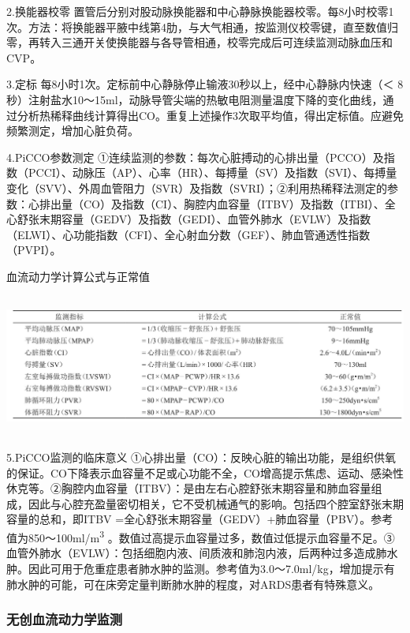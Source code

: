 2.换能器校零
置管后分别对股动脉换能器和中心静脉换能器校零。每8小时校零1次。方法：将换能器平腋中线第4肋，与大气相通，按监测仪校零键，直至数值归零，再转入三通开关使换能器与各导管相通，校零完成后可连续监测动脉血压和CVP。

3.定标 每8小时1次。定标前中心静脉停止输液30秒以上，经中心静脉内快速（＜
8秒）注射盐水10～15ml，动脉导管尖端的热敏电阻测量温度下降的变化曲线，通过分析热稀释曲线计算得出CO。重复上述操作3次取平均值，得出定标值。应避免频繁测定，增加心脏负荷。

4.PiCCO参数测定
①连续监测的参数：每次心脏搏动的心排出量（PCCO）及指数（PCCI）、动脉压（AP）、心率（HR）、每搏量（SV）及指数（SVI）、每搏量变化（SVV）、外周血管阻力（SVR）及指数（SVRI）；②利用热稀释法测定的参数：心排出量（CO）及指数（CI）、胸腔内血容量（ITBV）及指数（ITBI）、全心舒张末期容量（GEDV）及指数（GEDI）、血管外肺水（EVLW）及指数（ELWI）、心功能指数（CFI）、全心射血分数（GEF）、肺血管通透性指数（PVPI）。

\begin{table}[htbp]
\centering
\caption{血流动力学计算公式与正常值}
\label{tab139-3}
\includegraphics[width=6.59375in,height=1.84375in]{./images/Image00527.jpg}
\end{table}

5.PiCCO监测的临床意义
①心排出量（CO）：反映心脏的输出功能，是组织供氧的保证。CO下降表示血容量不足或心功能不全，CO增高提示焦虑、运动、感染性休克等。②胸腔内血容量（ITBV）：是由左右心腔舒张末期容量和肺血容量组成，因此与心腔充盈量密切相关，它不受机械通气的影响。包括四个腔室舒张末期容量的总和，即ITBV
=全心舒张末期容量（GEDV）+肺血容量（PBV）。参考值为850～100ml/m\textsuperscript{3}
。数值过高提示血容量过多，数值过低提示血容量不足。③血管外肺水（EVLW）：包括细胞内液、间质液和肺泡内液，后两种过多造成肺水肿。因此可用于危重症患者肺水肿的监测。参考值为3.0～7.0ml/kg，增加提示有肺水肿的可能，可在床旁定量判断肺水肿的程度，对ARDS患者有特殊意义。

\subsubsection{无创血流动力学监测}

